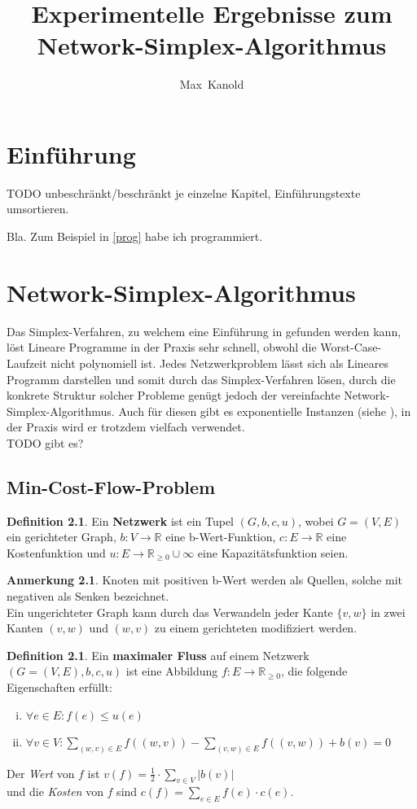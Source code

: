 \documentclass[a4paper,twoside,ngerman]{report}
\author{Max~Kanold}
\title{Experimentelle Ergebnisse zum Network-Simplex-Algorithmus}
\theoremstyle{plain}
\theoremstyle{definition}
\newtheorem{defn}[thm]{Definition}
\newtheorem*{anm}{Anmerkung}
\begin{document}
\maketitle
\tableofcontents

\newpage
\chapter{Einführung}
TODO unbeschränkt/beschränkt je einzelne Kapitel, Einführungstexte umsortieren.

Bla. Zum Beispiel in \cref{prog} habe ich programmiert.

\newpage
\chapter{Network-Simplex-Algorithmus}
Das Simplex-Verfahren, zu welchem eine Einführung in \cite{NSAbook} gefunden werden kann, löst Lineare Programme in der Praxis sehr schnell, obwohl die Worst-Case-Laufzeit nicht polynomiell ist. Jedes Netzwerkproblem lässt sich als Lineares Programm darstellen und somit durch das Simplex-Verfahren lösen, durch die konkrete Struktur solcher Probleme genügt jedoch der vereinfachte Network-Simplex-Algorithmus. Auch für diesen gibt es exponentielle Instanzen (siehe \cite{Exponential}), in der Praxis wird er trotzdem vielfach verwendet.\\
TODO gibt es?

\section{Min-Cost-Flow-Problem}
\begin{defn}Ein \textbf{Netzwerk} ist ein Tupel $(G,b,c,u)$, wobei $G = (V,E)$ ein gerichteter Graph, $b : V\rightarrow\mathbb{R}$ eine b-Wert-Funktion, $c : E\rightarrow\mathbb{R}$ eine Kostenfunktion und $u : E\rightarrow\mathbb{R}_{\geq 0}\cup \infty$ eine Kapazitätsfunktion seien.\end{defn}
\begin{anm}Knoten mit positiven b-Wert werden als Quellen, solche mit negativen als Senken bezeichnet.\\
Ein ungerichteter Graph kann durch das Verwandeln jeder Kante $\{v,w\}$ in zwei Kanten $(v,w)$ und $(w,v)$ zu einem gerichteten modifiziert werden.\end{anm}

\begin{defn}\label{DefMaxFlow}Ein \textbf{maximaler Fluss} auf einem Netzwerk $(G=(V,E),b,c,u)$ ist eine Abbildung $f : E\rightarrow\mathbb{R}_{\geq 0}$, die folgende Eigenschaften erfüllt:
\begin{enumerate}[(i)]
\item $\forall e\in E : f(e)\leq u(e) $
\item $\forall v\in V : \sum_{(w,v)\in E} f((w,v)) - \sum_{(v,w)\in E} f((v,w)) + b(v) = 0$\label{DefMaxFlowII}
\end{enumerate}
Der \emph{Wert} von $f$ ist
$v(f) = \frac{1}{2}\cdot\sum_{v\in V} |b(v)|$\\
und die \emph{Kosten} von $f$ sind
$c(f) = \sum_{e\in E} f(e)\cdot c(e)$.
\end{defn}
\end{document}
